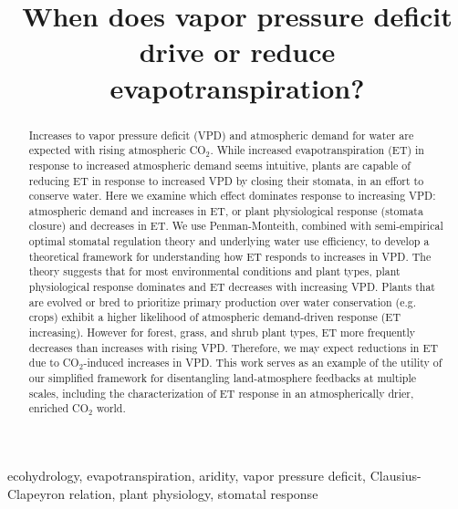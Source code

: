 \documentclass[draft,linenumbers]{agujournal}
\begin{document}
\title{When does vapor pressure deficit drive or reduce evapotranspiration?}





\begin{keypoints}
\item ecohydrology, evapotranspiration, aridity, vapor pressure deficit, Clausius-Clapeyron relation, plant physiology, stomatal response
\end{keypoints}


\begin{abstract}
  Increases to vapor pressure deficit (VPD) and atmospheric demand for water are expected with rising atmospheric CO$_2$. While increased evapotranspiration (ET) in response to increased atmospheric demand seems intuitive, plants are capable of reducing ET in response to increased VPD by closing their stomata, in an effort to conserve water. Here we examine which effect dominates response to increasing VPD: atmospheric demand and increases in ET, or plant physiological response (stomata closure) and decreases in ET. We use Penman-Monteith, combined with semi-empirical optimal stomatal regulation theory and underlying water use efficiency, to develop a theoretical framework for understanding how ET responds to increases in VPD.
  The theory suggests that for most environmental conditions and plant types, plant physiological response dominates and ET decreases with increasing VPD. Plants that are evolved or bred to prioritize primary production over water conservation (e.g. crops) exhibit a higher likelihood of atmospheric demand-driven response (ET increasing). However for forest, grass, and shrub plant types, ET more frequently decreases than increases with rising VPD. Therefore, we may expect reductions in ET due to CO$_2$-induced increases in VPD. This work serves as an example of the utility of our simplified framework for disentangling land-atmosphere feedbacks at multiple scales, including the characterization of ET response in an atmospherically drier, enriched CO$_2$ world. 
 
\end{abstract}
\end{document}
